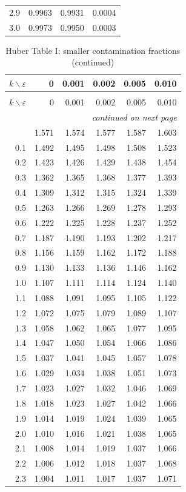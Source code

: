 \begin{center}
\begin{longtable}{rrrr}
2.9&0.9963&0.9931&0.0004\\
3.0&0.9973&0.9950&0.0003\\
\end{longtable}
\begin{longtable}{rrrrrr}
\caption{Huber Table I: smaller contamination fractions}
\label{tab:p15-huber-table-one-small}\\
\(k\backslash\varepsilon\)&0&0.001&0.002&0.005&0.010\\\hline
\endfirsthead
\caption[]{Huber Table I: smaller contamination fractions (continued)}\\
\(k\backslash\varepsilon\)&0&0.001&0.002&0.005&0.010\\\hline
\endhead
\hline\multicolumn{6}{r}{\emph{continued on next page}}\\
\endfoot
\endlastfoot
0.0&1.571&1.574&1.577&1.587&1.603\\
0.1&1.492&1.495&1.498&1.508&1.523\\
0.2&1.423&1.426&1.429&1.438&1.454\\
0.3&1.362&1.365&1.368&1.377&1.393\\
0.4&1.309&1.312&1.315&1.324&1.339\\
0.5&1.263&1.266&1.269&1.278&1.293\\
0.6&1.222&1.225&1.228&1.237&1.252\\
0.7&1.187&1.190&1.193&1.202&1.217\\
0.8&1.156&1.159&1.162&1.172&1.188\\
0.9&1.130&1.133&1.136&1.146&1.162\\
1.0&1.107&1.111&1.114&1.124&1.140\\
1.1&1.088&1.091&1.095&1.105&1.122\\
1.2&1.072&1.075&1.079&1.089&1.107\\
1.3&1.058&1.062&1.065&1.077&1.095\\
1.4&1.047&1.050&1.054&1.066&1.086\\
1.5&1.037&1.041&1.045&1.057&1.078\\
1.6&1.029&1.034&1.038&1.051&1.073\\
1.7&1.023&1.027&1.032&1.046&1.069\\
1.8&1.018&1.023&1.027&1.042&1.066\\
1.9&1.014&1.019&1.024&1.039&1.065\\
2.0&1.010&1.016&1.021&1.038&1.065\\
2.1&1.008&1.014&1.019&1.037&1.066\\
2.2&1.006&1.012&1.018&1.037&1.068\\
2.3&1.004&1.011&1.017&1.037&1.071\\

\end{longtable}
\end{center}
